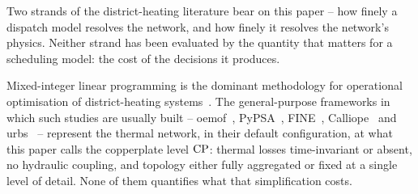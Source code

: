 
Two strands of the district-heating literature bear on this paper -- how finely a
dispatch model resolves the network, and how finely it resolves the network's physics.
Neither strand has been evaluated by the quantity that matters for a scheduling model:
the cost of the decisions it produces.

Mixed-integer linear programming is the dominant methodology for operational
optimisation of district-heating systems~\cite{Fang2016}. The general-purpose
frameworks in which such studies are usually built -- oemof~\cite{Hilpert2018_oemof},
PyPSA~\cite{Brown2018_pypsa}, FINE~\cite{Welder2018_FINE},
Calliope~\cite{Pfenninger2018_calliope} and urbs~\cite{Dorfner2016_urbs} --
represent the thermal network, in their default configuration, at what this paper calls
the copperplate level $\mathrm{CP}$: thermal losses time-invariant or absent, no hydraulic
coupling, and topology either fully aggregated or fixed at a single level of detail.
None of them quantifies what that simplification costs.

